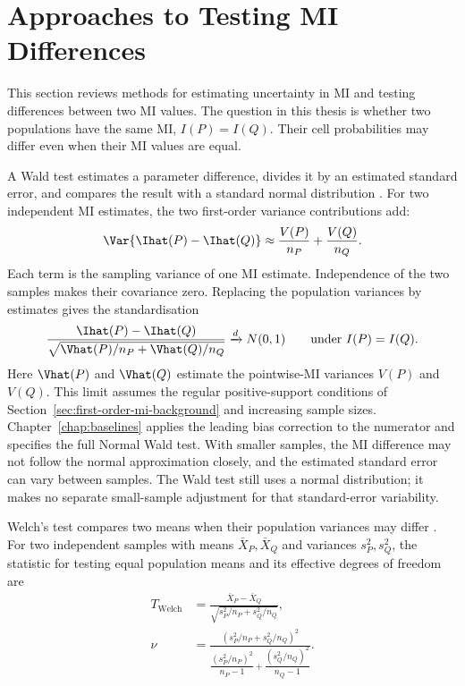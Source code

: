\section{Approaches to Testing MI Differences}
\label{sec:welch-background}

This section reviews methods for estimating uncertainty in MI and testing
differences between two MI values. The question in this thesis is whether two
populations have the same MI, \(I(P)=I(Q)\). Their cell probabilities may
differ even when their MI values are equal.


A Wald test estimates a parameter difference, divides it by an estimated
standard error, and compares the result with a standard normal distribution
\citep{wald1943,vanderVaart1998}.
For two independent MI estimates, the two first-order variance contributions
add:
\begin{equation}
  \Var\{\Ihat(P)-\Ihat(Q)\}
  \approx \frac{V(P)}{n_P}+\frac{V(Q)}{n_Q}.
  \label{eq:background-two-sample-variance}
\end{equation}
Each term is the sampling variance of one MI estimate. Independence of the
two samples makes their covariance zero. Replacing the population variances
by estimates gives the standardisation
\begin{equation}
  \frac{\Ihat(P)-\Ihat(Q)}
       {\sqrt{\Vhat(P)/n_P+\Vhat(Q)/n_Q}}
  \xrightarrow{d}N(0,1)
  \qquad\text{under }I(P)=I(Q).
  \label{eq:background-wald-standardisation}
\end{equation}
Here \(\Vhat(P)\) and \(\Vhat(Q)\) estimate the pointwise-MI variances
\(V(P)\) and \(V(Q)\). This limit assumes the regular positive-support
conditions of Section~\ref{sec:first-order-mi-background} and increasing
sample sizes. Chapter~\ref{chap:baselines} applies the leading bias correction
to the numerator and specifies the full Normal Wald test.
With smaller samples, the MI difference may not follow the normal
approximation closely, and the estimated standard error can vary between
samples. The Wald test still uses a normal distribution; it makes no separate
small-sample adjustment for that standard-error variability.

\medskip
{}

Welch's test compares two means when their population variances may differ
\citep{welch1947}. For two independent samples with means
\(\bar X_P,\bar X_Q\) and variances \(s_P^2,s_Q^2\), the statistic for
testing equal population means and its effective degrees of freedom are
\begin{align}
  T_{\mathrm{Welch}}
  &=\frac{\bar X_P-\bar X_Q}
          {\sqrt{s_P^2/n_P+s_Q^2/n_Q}},\\
  \nu
  &=\frac{\left(s_P^2/n_P+s_Q^2/n_Q\right)^2}
          {\dfrac{(s_P^2/n_P)^2}{n_P-1}
           +\dfrac{(s_Q^2/n_Q)^2}{n_Q-1}}.
  \label{eq:background-ordinary-welch}
\end{align}

